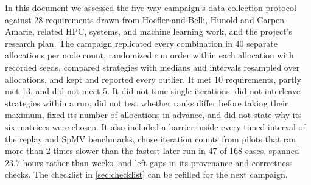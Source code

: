 \documentclass[11pt]{article}
\begin{document}
In this document we assessed the five-way campaign's data-collection protocol against 28
requirements drawn from Hoefler and Belli, Hunold and Carpen-Amarie, related HPC,
systems, and machine learning work, and the project's research plan. The campaign
replicated every combination in 40 separate allocations per node count, randomized run
order within each allocation with recorded seeds, compared strategies with medians and
intervals resampled over allocations, and kept and reported every outlier. It met 10
requirements, partly met 13, and did not meet 5. It did not time single iterations, did
not interleave strategies within a run, did not test whether ranks differ before taking
their maximum, fixed its number of allocations in advance, and did not state why its six
matrices were chosen. It also included a barrier inside every timed interval of the
replay and SpMV benchmarks, chose iteration counts from pilots that ran more than 2 times
slower than the fastest later run in 47 of 168 cases, spanned 23.7 hours rather than weeks, and left gaps in its provenance and
correctness checks. The checklist in \cref{sec:checklist} can be refilled for the next
campaign.



\end{document}
